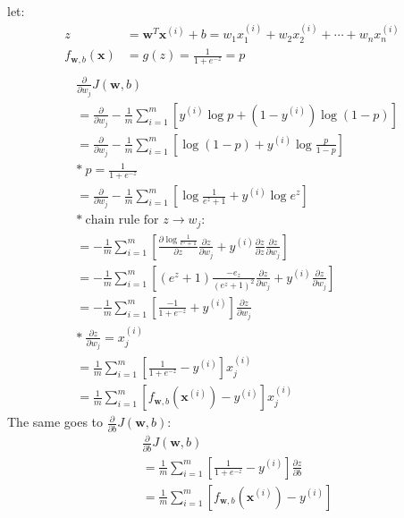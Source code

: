let:
\begin{align*}
    z &= \mathbf{w}^T \mathbf{x}^{(i)} + b = w_1x_1^{(i)} + w_2x_2^{(i)} + \cdots + w_nx_n^{(i)}\\
    f_{\mathbf{w}, b}(\mathbf{x}) &= g(z) = \frac{1}{1 + e^{-z}} = p\\
\end{align*}
\begin{align*}
    &\frac{\partial}{\partial w_j}J(\mathbf{w}, b)\\
    &= \frac{\partial}{\partial w_j}-\frac{1}{m} \sum_{i=1}^{m} \left[y^{(i)} \log p + (1 - y^{(i)}) \log(1 - p)\right]\\
    &= \frac{\partial}{\partial w_j}-\frac{1}{m} \sum_{i=1}^{m} \left[\log (1-p) + y^{(i)}\log \frac{p}{1-p}\right]\\
    & \ast \ p = \frac{1}{1 + e^{-z}}\\
    &= \frac{\partial}{\partial w_j}-\frac{1}{m} \sum_{i=1}^{m} \left[\log \frac{1}{e^z + 1} + y^{(i)}\log e^z\right]\\
    & \ast \ \text{chain rule for $z \rightarrow w_j$:}\\
    &= -\frac{1}{m} \sum_{i=1}^{m} \left[\frac{\partial \log \frac{1}{e^z + 1}}{\partial z}\frac{\partial z}{\partial w_j} + y^{(i)}\frac{\partial z}{\partial z}\frac{\partial z}{\partial w_j}\right]\\
    &= -\frac{1}{m} \sum_{i=1}^{m} \left[(e^z + 1)\frac{-e_z}{(e^z + 1)^2}\frac{\partial z}{\partial w_j} + y^{(i)}\frac{\partial z}{\partial w_j}\right]\\
    &= -\frac{1}{m} \sum_{i=1}^{m} \left[\frac{-1}{1+e^{-z}} + y^{(i)}\right]\frac{\partial z}{\partial w_j}\\
    & \ast \ \frac{\partial z}{\partial w_j} = x_j^{(i)}\\
    &= \frac{1}{m} \sum_{i=1}^{m} \left[\frac{1}{1+e^{-z}} - y^{(i)}\right]x_j^{(i)}\\
    &= \frac{1}{m} \sum_{i=1}^{m} \left[f_{\mathbf{w}, b}(\mathbf{x}^{(i)}) - y^{(i)}\right]x_j^{(i)}
\end{align*}
The same goes to $\frac{\partial}{\partial b}J(\mathbf{w}, b)$:
\begin{align*}
    &\frac{\partial}{\partial b}J(\mathbf{w}, b)\\
    &= \frac{1}{m} \sum_{i=1}^{m} \left[\frac{1}{1+e^{-z}} - y^{(i)}\right]\frac{\partial z}{\partial b}\\
    &= \frac{1}{m} \sum_{i=1}^{m} \left[f_{\mathbf{w}, b}(\mathbf{x}^{(i)}) - y^{(i)}\right]
\end{align*}